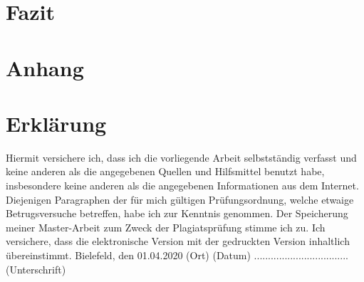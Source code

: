 \documentclass[
        ngerman,
        paper=a4,
        numbers=noendperiod,
]{scrreprt}
\begin{document}
\chapter{Fazit}
\appendix 
\chapter{Anhang}
\label{chapter:Anhang}%


\clearpage
        
        
        




\chapter*{Erklärung}
Hiermit versichere ich, dass ich die vorliegende Arbeit selbstständig verfasst und keine anderen als die angegebenen Quellen und Hilfsmittel benutzt habe, insbesondere keine anderen als die angegebenen Informationen aus dem Internet. Diejenigen Paragraphen der für mich gültigen Prüfungsordnung, welche etwaige Betrugsversuche betreffen, habe ich zur Kenntnis genommen. Der Speicherung meiner Master-Arbeit zum Zweck der Plagiatsprüfung stimme ich zu. Ich versichere, dass die elektronische Version mit der gedruckten Version inhaltlich übereinstimmt.\newline
\linebreak
\linebreak
\linebreak
Bielefeld, den 01.04.2020\newline
(Ort) (Datum)\newline
\linebreak
\linebreak
\linebreak
..................................\newline
(Unterschrift)
\end{document}
